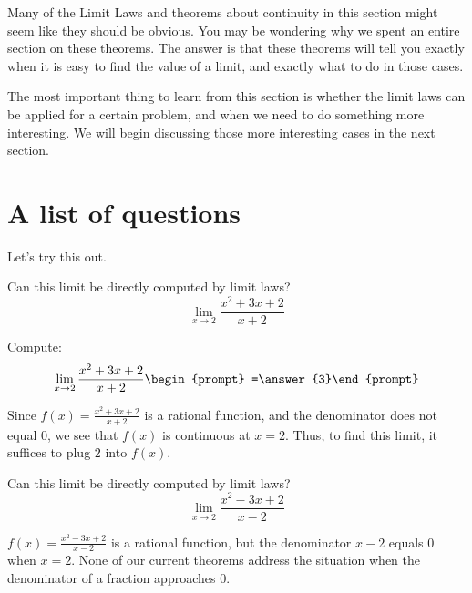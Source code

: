 \documentclass{ximera}
\begin{document}
Many of the Limit Laws and theorems about continuity in this section
might seem like they should be obvious.  You may be wondering why we
spent an entire section on these theorems.  The answer is that these
theorems will tell you exactly when it is easy to find the value of a
limit, and exactly what to do in those cases.

The most important thing to learn from this section is whether the
limit laws can be applied for a certain problem, and when we need to
do something more interesting.  We will begin discussing those more
interesting cases in the next section.  
\section{A list of questions}

Let's try this out.

\begin{question}
  Can this limit be directly computed by limit laws?
  \[
  \lim_{x\to 2}\frac{x^2+3x+2}{x+2} 
  \]
  \begin{multipleChoice}
  \end{multipleChoice}
  \begin{question}
    Compute:
    \[
    \lim_{x\to 2}\frac{x^2+3x+2}{x+2}\begin{prompt} =\answer{3}\end{prompt}
    \]
    \begin{feedback}
      Since $f(x)=\frac{x^2+3x+2}{x+2}$ is a rational function, and
      the denominator does not equal $0$, we see that $f(x)$ is
      continuous at $x=2$.  Thus, to find this limit, it suffices to
      plug $2$ into $f(x)$.
    \end{feedback}
  \end{question}
\end{question}


\begin{question}
  Can this limit be directly computed by limit laws?
  \[
  \lim_{x\to 2}\frac{x^2-3x+2}{x-2}
  \]
  \begin{multipleChoice}
  \end{multipleChoice}
  \begin{feedback}
    $f(x) = \frac{x^2-3x+2}{x-2}$ is a rational function, but the
    denominator $x-2$ equals $0$ when $x=2$. None of our current
    theorems address the situation when the denominator of a fraction
    approaches $0$.
  \end{feedback}
\end{question}
\end{document}
